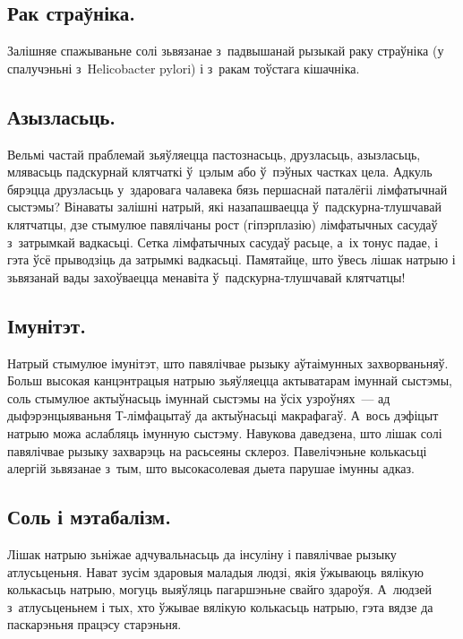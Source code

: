\subsection{Рак страўніка.}
Залішняе спажываньне солі зьвязанае з~падвышанай рызыкай раку страўніка (у спалучэньні з~Helicobacter pylori) і з~ракам тоўстага кішачніка.

\subsection{Азызласьць.}
Вельмі частай праблемай зьяўляецца пастознасьць, друзласьць, азызласьць, млявасьць падскурнай клятчаткі ў~цэлым або ў~пэўных частках цела. Адкуль бярэцца друзласьць у~здаровага чалавека бязь першаснай паталёгіі лімфатычнай сыстэмы? Вінаваты залішні натрый, які назапашваецца ў~падскурна-тлушчавай клятчатцы, дзе стымулюе павялічаны рост (гіпэрплазію) лімфатычных сасудаў з~затрымкай вадкасьці. Сетка лімфатычных сасудаў расьце, а~іх тонус падае, і гэта ўсё прыводзіць да затрымкі вадкасьці. Памятайце, што ўвесь лішак натрыю і зьвязанай вады захоўваецца менавіта ў~падскурна-тлушчавай клятчатцы!


\subsection{Імунітэт.}
Натрый стымулюе імунітэт, што павялічвае рызыку аўтаімунных захворваньняў. Больш высокая канцэнтрацыя натрыю зьяўляецца актыватарам імуннай сыстэмы, соль стымулюе актыўнасьць імуннай сыстэмы на ўсіх узроўнях~--- ад дыфэрэнцыяваньня Т-лімфацытаў да актыўнасьці макрафагаў. А~вось дэфіцыт натрыю можа аслабляць імунную сыстэму. Навукова даведзена, што лішак солі павялічвае рызыку захварэць на расьсеяны склероз. Павелічэньне колькасьці алергій зьвязанае з~тым, што высокасолевая дыета парушае імунны адказ.

\subsection{Соль і мэтабалізм.}
Лішак натрыю зьніжае адчувальнасьць да інсуліну і павялічвае рызыку атлусьценьня. Нават зусім здаровыя маладыя людзі, якія ўжываюць вялікую колькасьць натрыю, могуць выяўляць пагаршэньне свайго здароўя. А~людзей з~атлусьценьнем і тых, хто ўжывае вялікую колькасьць натрыю, гэта вядзе да паскарэньня працэсу старэньня.

